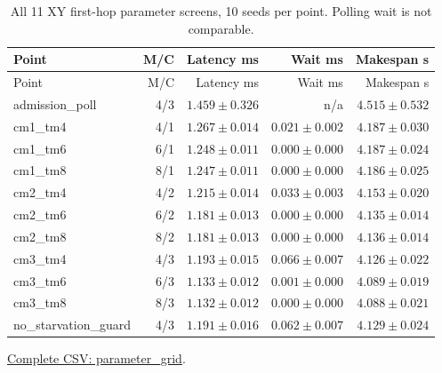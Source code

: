 \begin{center}\small
\begin{longtable}{lrrrr}
\caption{All 11 XY first-hop parameter screens, 10 seeds per point. Polling wait is not comparable.}\\
\toprule
Point & M/C & Latency ms & Wait ms & Makespan s \\
\midrule\endfirsthead
\toprule
Point & M/C & Latency ms & Wait ms & Makespan s \\
\midrule\endhead
admission\_poll & 4/3 & $1.459 \pm 0.326$ & n/a & $4.515 \pm 0.532$ \\
cm1\_tm4 & 4/1 & $1.267 \pm 0.014$ & $0.021 \pm 0.002$ & $4.187 \pm 0.030$ \\
cm1\_tm6 & 6/1 & $1.248 \pm 0.011$ & $0.000 \pm 0.000$ & $4.187 \pm 0.024$ \\
cm1\_tm8 & 8/1 & $1.247 \pm 0.011$ & $0.000 \pm 0.000$ & $4.186 \pm 0.025$ \\
cm2\_tm4 & 4/2 & $1.215 \pm 0.014$ & $0.033 \pm 0.003$ & $4.153 \pm 0.020$ \\
cm2\_tm6 & 6/2 & $1.181 \pm 0.013$ & $0.000 \pm 0.000$ & $4.135 \pm 0.014$ \\
cm2\_tm8 & 8/2 & $1.181 \pm 0.013$ & $0.000 \pm 0.000$ & $4.136 \pm 0.014$ \\
cm3\_tm4 & 4/3 & $1.193 \pm 0.015$ & $0.066 \pm 0.007$ & $4.126 \pm 0.022$ \\
cm3\_tm6 & 6/3 & $1.133 \pm 0.012$ & $0.001 \pm 0.000$ & $4.089 \pm 0.019$ \\
cm3\_tm8 & 8/3 & $1.132 \pm 0.012$ & $0.000 \pm 0.000$ & $4.088 \pm 0.021$ \\
no\_starvation\_guard & 4/3 & $1.191 \pm 0.016$ & $0.062 \pm 0.007$ & $4.129 \pm 0.024$ \\
\bottomrule\end{longtable}\end{center}
{\footnotesize \href{https://github.com/sanjeevkrishnaa/Compiler-Driven-ACE/blob/codex/ace-scheduler-correctness/docs/latex/oct25_pre_golden/data/parameter_grid.csv}{Complete CSV: parameter\_grid}. }
